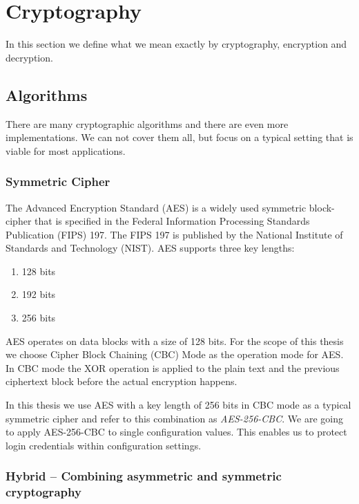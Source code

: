 \section{Cryptography}

In this section we define what we mean exactly by cryptography, encryption and decryption.

\subsection{Algorithms}

There are many cryptographic algorithms and there are even more implementations.
We can not cover them all, but focus on a typical setting that is viable for most applications.

\subsubsection{Symmetric Cipher}

The Advanced Encryption Standard (AES) is a widely used symmetric block-cipher that is specified in the Federal Information Processing Standards Publication (FIPS) 197.
The FIPS 197 is published by the National Institute of Standards and Technology (NIST).\cite{fips197}
AES supports three key lengths:
\begin{enumerate}
  \item 128 bits
  \item 192 bits
  \item 256 bits
\end{enumerate}

AES operates on data blocks with a size of 128 bits.\cite{fips197,stallings2014}
For the scope of this thesis we choose Cipher Block Chaining (CBC) Mode as the operation mode for AES.
In CBC mode the XOR operation is applied to the plain text and the previous ciphertext block before the actual encryption happens.\cite{bruceschneier1996,stallings2014}

In this thesis we use AES with a key length of 256 bits in CBC mode as a typical symmetric cipher and refer to this combination as \emph{AES-256-CBC}.
We are going to apply AES-256-CBC to single configuration values.
This enables us to protect login credentials within configuration settings.

\subsubsection{Hybrid -- Combining asymmetric and symmetric cryptography}

